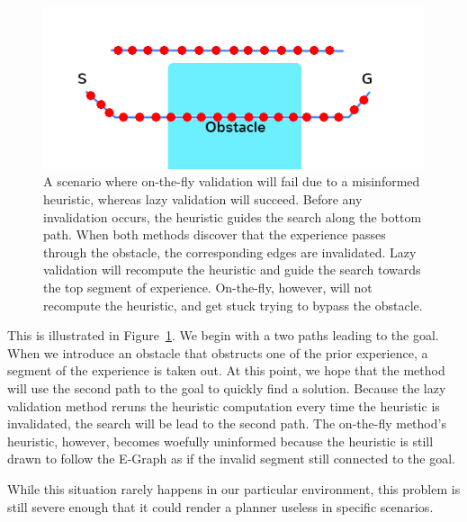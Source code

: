 \documentclass[letterpaper, 10 pt, conference]{ieeeconf}  %
\newcommand{\figref}[1]{Figure~\ref{fig:#1}}
\newcommand{\figlab}[1]{\label{fig:#1}}
\begin{document}
\begin{figure}[ht]
    \includegraphics[width=1\columnwidth]{ontheflyprob7.png}
    \caption{A scenario where on-the-fly validation will fail due to a
    misinformed heuristic, whereas lazy validation will succeed. Before any
invalidation occurs, the heuristic guides the search along the bottom path. When
both methods discover that the experience passes through the obstacle, the
corresponding edges are invalidated. Lazy validation will recompute the
heuristic and guide the search towards the top segment of experience.
On-the-fly, however, will not recompute the heuristic, and get stuck trying to
bypass the obstacle.}
    \figlab{ontheflyprob}
\end{figure}

This is illustrated in \figref{ontheflyprob}. We begin with a two paths leading
to the goal. When we introduce an obstacle that obstructs one of the prior
experience, a segment of the experience is taken out. At this point, we hope
that the method will use the second path to the goal to quickly find a solution.
Because the lazy validation method reruns the heuristic computation every time
the heuristic is invalidated, the search will be lead to the second path. The
on-the-fly method's heuristic, however, becomes woefully uninformed because the
heuristic is still drawn to follow the E-Graph as if the invalid segment still
connected to the goal. 

While this situation rarely happens in our particular environment, this problem
is still severe enough that it could render a planner useless in specific
scenarios.


\end{document}

